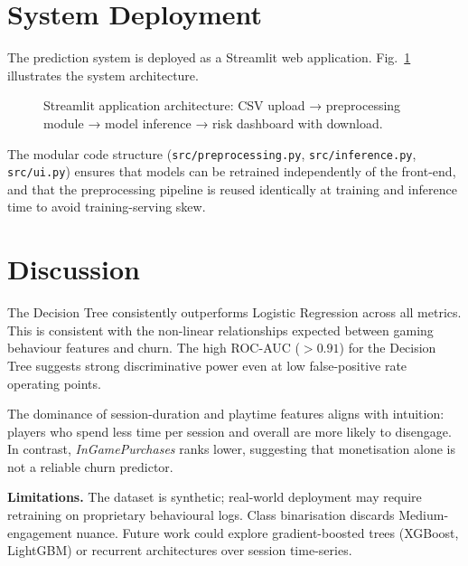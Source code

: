 \documentclass[conference]{IEEEtran}
\begin{document}
\section{System Deployment}

The prediction system is deployed as a Streamlit web application.
Fig.~\ref{fig:app_arch} illustrates the system architecture.

\begin{figure}[H]
  \centering
  \caption{Streamlit application architecture: CSV upload → preprocessing
           module → model inference → risk dashboard with download.}
  \label{fig:app_arch}
\end{figure}

The modular code structure (\texttt{src/preprocessing.py},
\texttt{src/inference.py}, \texttt{src/ui.py}) ensures that models can be
retrained independently of the front-end, and that the preprocessing
pipeline is reused identically at training and inference time to avoid
training-serving skew.

\section{Discussion}

The Decision Tree consistently outperforms Logistic Regression across all
metrics.  This is consistent with the non-linear relationships expected between
gaming behaviour features and churn.  The high ROC-AUC ($>0.91$) for the
Decision Tree suggests strong discriminative power even at low false-positive
rate operating points.

The dominance of session-duration and playtime features aligns with intuition:
players who spend less time per session and overall are more likely to disengage.
In contrast, \emph{InGamePurchases} ranks lower, suggesting that monetisation
alone is not a reliable churn predictor.

\textbf{Limitations.}  The dataset is synthetic; real-world deployment may
require retraining on proprietary behavioural logs.  Class binarisation
discards Medium-engagement nuance.  Future work could explore gradient-boosted
trees (XGBoost, LightGBM) or recurrent architectures over session time-series.
\end{document}
